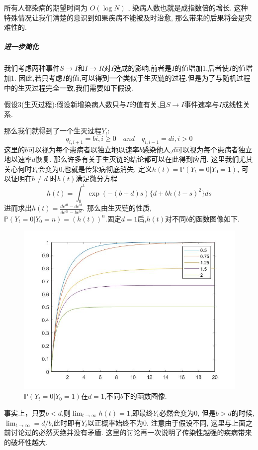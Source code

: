 \documentclass[UTF8]{ctexart}
\begin{document}
			所有人都染病的期望时间为 \(O(\log{N})\) , 染病人数也就是成指数倍的增长.
			这种特殊情况让我们清楚的意识到如果疾病不能被及时治愈,
			那么带来的后果将会是灾难性的.
			
			
			\subparagraph{进一步简化}
			
			我们考虑两种事件\(S \to I\)和\(I \to R\)对\(I\)造成的影响,前者是\(I\)的值增加1,后者使\(I\)的值增加1. 因此,若只考虑\(I\)的值,可以得到一个类似于生灭链的过程.但是为了与随机过程中的生灭过程完全一致,我们需要如下假设.
			
			假设3(生灭过程):假设新增染病人数只与\(I\)的值有关,且\(S \to I\)事件速率与\(I\)成线性关系.
			
			那么我们就得到了一个生灭过程\(Y_t\):
			\begin{equation}
			q_{i,i+1}=bi,i \ge 0 \quad and \quad
			q_{i,i-1} = di, i >0
			\end{equation}
			这里的\(b\)可以视为每个患病者以独立地以速率\(b\)感染他人,\(d\)可以视为每个患病者独立地以速率\(d\)恢复. 那么许多有关于生灭链的结论都可以在此得到应用. 这里我们尤其关心何时\(Y_t\)会变为\(0\),也就是传染病彻底消失. 定义\(h(t) = \mathbb{P}(Y_t=0|Y_0 =1)\), 可以证明在\(b \neq d\) 时\(h(t)\)满足微分方程
			\begin{equation*}
			h(t) = \int_0^t \exp(-(b +d )s)\{d +b h(t-s)^2\}ds
			\end{equation*}
			进而求出\(h(t) = \frac{d e^{d t}-d e^{b t}}{d e^{d t}- b e^{b t}}\). 那么由生灭链的性质, \(\mathbb{P}(Y_t=0|Y_0 = n)= (h(t))^n\).固定\(d=1\)后,\(h(t)\)对不同\(b\)的函数图像如下.
			
			\begin{figure}[H]
				\centering
				\includegraphics[width=0.5\linewidth]{pic.jpg}
				\caption{ \(\mathbb{P}(Y_t=0|Y_0 =1)\)在\(d=1\),不同\(b\)下的函数图像.}
				\label{fig:my_label}
			\end{figure}
			
			事实上，只要\(b <d\),则\(\lim_{t\to \infty}h(t) = 1\),即最终\(Y_t\)必然会变为\(0\), 但是\(b>d\)的时候,\(\lim_{t\to \infty} = d/b\),此时即有\(Y_t\)以正概率始终不为\(0\). 注意由于假设不同, 这里与上面之前讨论过的必然灭绝并没有矛盾. 这里的讨论再一次说明了传染性越强的疾病带来的破坏性越大.
		
\end{document}
